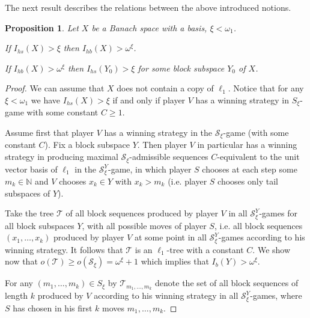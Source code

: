 \documentclass[a4paper]{amsart}
\theoremstyle{plain}
\newtheorem{proposition}[theorem]{Proposition}
\newcommand{\N}{\mathbb{N}}
\newcommand{\mc}{\mathcal}
\begin{document}
The next result describes the relations between the above
introduced notions.
\begin{proposition}\label{her-asympt}
Let $X$ be a Banach space with a basis, $\xi<\omega_1$.

If $I_{hs}(X)>\xi$ then $I_{hb}(X)>\omega^\xi$.

If $I_{hb}(X)>\omega^{\xi}$ then $I_{hs}(Y_0)>\xi$ for some block
subspace $Y_0$ of $X$.
\end{proposition}
\begin{proof}
We can assume that $X$ does not contain a copy of $\ell_{1}$. Notice
that for any $\xi<\omega_1$ we have $I_{hs}(X)>\xi$ if and only if
player $V$ has a winning strategy in $S_\xi$-game with some
constant $C\geq 1$.

Assume first that player $V$ has a winning strategy in the
$\mc{S}_\xi$-game (with some constant $C$). Fix a block subspace
$Y$. Then player $V$ in particular has a winning strategy in
producing maximal $\mc{S}_\xi$-admissible sequences
$C$-equivalent to the unit vector basis of $\ell_{1}$ in the
$\mc{S}_\xi^Y$-game, in which player $S$ chooses at each step some
$m_k\in\N$ and $V$ chooses $x_k\in Y$ with $x_k>m_k$ (i.e. player
$S$ chooses only tail subspaces of $Y$).

Take the tree $\mc{T}$ of all block sequences produced by player
$V$ in all $\mc{S}_\xi^Y$-games for all block subspaces $Y$,
with all possible moves of player $S$,
i.e. all block sequences $(x_1,\dots,x_k)$ produced by player
$V$ at some point in all $\mc{S}_\xi^Y$-games according to his
winning strategy. It follows that $\mc{T}$ is an $\ell_{1}$-tree
with a constant $C$. We show now that $o(\mc{T})\geq
o(\mc{S}_\xi)=\omega^\xi+1$ which implies that
$I_b(Y)>\omega^\xi$.

For any $(m_1,\dots,m_k)\in S_\xi$ by $\mc{T}_{m_1,\dots,m_k}$
denote the set of all block sequences of length $k$ produced by
$V$ according to his winning strategy in all $\mc{S}_\xi^Y$-games,
where $S$ has chosen in his first $k$ moves $m_1,\dots,m_k$.


\end{proof}
\end{document}

